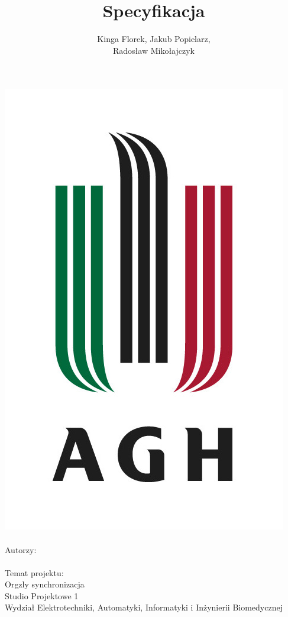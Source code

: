 \documentclass[12pt]{article}
\title{Specyfikacja}
\author{Kinga Florek, Jakub Popielarz, \\Radosław Mikołajczyk}
\begin{document}
\makeatletter
    \begin{titlepage}
        \begin{center}
            \includegraphics[scale=0.8]{agh_znk_wbr_rgb_150ppi.jpg}\\ \bigbreak
            {\Huge \bfseries  \@title }\\[2ex] 
            {\large Autorzy: \\ \@author}\\ \bigbreak
            {\large Temat projektu: \\ Orgzly synchronizacja} \\ \bigbreak
            \vspace{8mm}
            {\huge Studio Projektowe 1} \\ \bigbreak
            {\large Wydział Elektrotechniki, Automatyki, Informatyki i Inżynierii Biomedycznej} \\ 
        \end{center}
    \end{titlepage}
\makeatother
\end{document}
